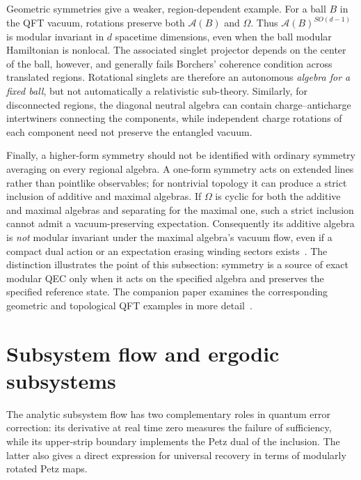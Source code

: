 \documentclass[a4paper,11pt]{article}
\theoremstyle{definition}
\begin{document}
Geometric symmetries give a weaker, region-dependent example. For a
ball $B$ in the QFT vacuum, rotations preserve both $\mathcal A(B)$ and
$\Omega$. Thus $\mathcal A(B)^{SO(d-1)}$ is modular invariant in
$d$ spacetime dimensions, even when the ball modular Hamiltonian is
nonlocal. The associated singlet projector depends on the center of the
ball, however, and generally fails Borchers' coherence condition across
translated regions. Rotational singlets are therefore an autonomous
\emph{algebra for a fixed ball}, but not automatically a relativistic
sub-theory. Similarly, for disconnected regions, the diagonal neutral
algebra can contain charge--anticharge intertwiners connecting the
components, while independent charge rotations of each component need
not preserve the entangled vacuum.

Finally, a higher-form symmetry should not be identified with ordinary
symmetry averaging on every regional algebra. A one-form symmetry acts
on extended lines rather than pointlike observables; for nontrivial
topology it can produce a strict inclusion of additive and maximal
algebras. If $\Omega$ is cyclic for both the additive and maximal algebras and separating
for the maximal one, such a strict inclusion cannot admit a
vacuum-preserving expectation. Consequently its additive algebra is
\emph{not} modular invariant under the maximal algebra's vacuum flow,
even if a compact dual action or an expectation erasing winding sectors
exists~\cite{GaiottoKapustinSeibergWillett2015,CasiniHuertaMaganPontello2021}.
The distinction illustrates the point of this subsection: symmetry is a
source of exact modular QEC only when it acts on the specified algebra
and preserves the specified reference state. The companion paper
examines the corresponding geometric and topological QFT examples in
more detail~\cite{companionQFT}.


\section{Subsystem flow and ergodic subsystems}\label{sec:ergodic}


The analytic subsystem flow has two complementary roles in quantum
error correction: its derivative at real time zero measures the failure
of sufficiency, while its upper-strip boundary implements the Petz dual
of the inclusion. The latter also gives a direct expression for
universal recovery in terms of modularly rotated Petz maps.
\end{document}
